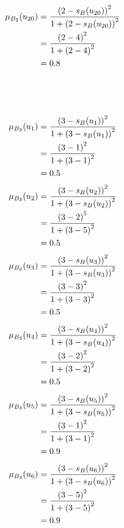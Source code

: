 \documentclass[a4paper]{book}
\begin{document}
				\begin{align}
					\mu_{B_2}(u_{20}) &= \frac{\left(2-s_B(u_{20})\right)^2}{1 + \left(2-s_B(u_{20})\right)^2}\\
					&= \frac{\left(2-4\right)^2}{1 + \left(2-4\right)^2} \notag \\
					&= 0.8 \notag
				\end{align}
				\\
				\\
				\\
				\begin{align}
					\mu_{B_3}(u_1) &= \frac{\left(3-s_B(u_1)\right)^2}{1 + \left(3-s_B(u_1)\right)^2}\\
					&= \frac{\left(3-1\right)^2}{1 + \left(3-1\right)^2} \notag \\
					&= 0.5 \notag
				\end{align}
				\begin{align}
					\mu_{B_3}(u_2) &= \frac{\left(3-s_B(u_2)\right)^2}{1 + \left(3-s_B(u_2)\right)^2}\\
					&= \frac{\left(3-2\right)^5}{1 + \left(3-5\right)^2} \notag \\
					&= 0.5 \notag
				\end{align}
				\begin{align}
					\mu_{B_3}(u_3) &= \frac{\left(3-s_B(u_3)\right)^2}{1 + \left(3-s_B(u_3)\right)^2}\\
					&= \frac{\left(3-3\right)^2}{1 + \left(3-3\right)^2} \notag \\
					&= 0.5 \notag
				\end{align}
				\begin{align}
					\mu_{B_3}(u_4) &= \frac{\left(3-s_B(u_4)\right)^2}{1 + \left(3-s_B(u_4)\right)^2}\\
					&= \frac{\left(3-2\right)^2}{1 + \left(3-2\right)^2} \notag \\
					&= 0.5 \notag
				\end{align}
				\begin{align}
					\mu_{B_3}(u_5) &= \frac{\left(3-s_B(u_5)\right)^2}{1 + \left(3-s_B(u_5)\right)^2}\\
					&= \frac{\left(3-1\right)^2}{1 + \left(3-1\right)^2} \notag \\
					&= 0.9 \notag
				\end{align}
				\begin{align}
					\mu_{B_3}(u_6) &= \frac{\left(3-s_B(u_6)\right)^2}{1 + \left(3-s_B(u_6)\right)^2}\\
					&= \frac{\left(3-5\right)^2}{1 + \left(3-5\right)^2} \notag \\
					&= 0.9 \notag
				\end{align}
\end{document}
